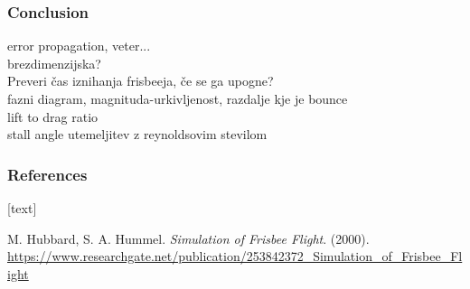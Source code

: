 \documentclass{beamer}
\begin{document}

\begin{frame}

\frametitle{Conclusion}
error propagation, veter...\\
brezdimenzijska?\\
Preveri čas iznihanja frisbeeja, če se ga upogne?\\
fazni diagram, magnituda-urkivljenost, razdalje kje je bounce\\
lift to drag ratio\\
stall angle utemeljitev z reynoldsovim stevilom\\
\end{frame}


\begin{frame}

\frametitle{References}

[text]

\begin{thebibliography}{9}

M. Hubbard, S. A. Hummel. \textit{Simulation of Frisbee Flight}. (2000). \url{https://www.researchgate.net/publication/253842372_Simulation_of_Frisbee_Flight}

\end{thebibliography}

\end{frame}

\end{document}
